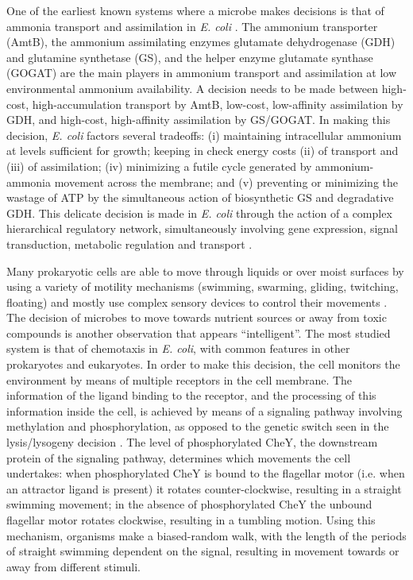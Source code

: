 One of the earliest known systems where a microbe makes decisions is that of ammonia transport and assimilation in \textit{E. coli} \cite{van_heeswijk_nitrogen_2013}. The ammonium transporter (AmtB), the ammonium assimilating enzymes glutamate dehydrogenase (GDH) and glutamine synthetase (GS), and the helper enzyme glutamate synthase (GOGAT) are the main players in ammonium transport and assimilation at low environmental ammonium availability. A decision needs to be made between high-cost, high-accumulation transport by AmtB, low-cost, low-affinity assimilation by GDH, and high-cost, high-affinity assimilation by GS/GOGAT. In making this decision, \textit{E. coli} factors several tradeoffs: (i) maintaining intracellular ammonium at levels sufficient for growth; keeping in check energy costs (ii) of transport and (iii) of assimilation; (iv) minimizing a futile cycle generated by ammonium-ammonia movement across the membrane; and (v) preventing or minimizing the wastage of ATP by the simultaneous action of biosynthetic GS and degradative GDH. This delicate decision is made in \textit{E. coli} through the action of a complex hierarchical regulatory network, simultaneously involving gene expression, signal transduction, metabolic regulation and transport \cite{kahn_control_1991,bruggeman_multifarious_2005,boogerd_amtb-mediated_2011,van_heeswijk_nitrogen_2013}.

Many prokaryotic cells are able to move through liquids or over moist surfaces by using a variety of motility mechanisms (swimming, swarming, gliding, twitching, floating) and mostly use complex sensory devices to control their movements \cite{jarrell_surprisingly_2008}. The decision of microbes to move towards nutrient sources or away from toxic compounds is another observation that appears ``intelligent''. The most studied system is that of chemotaxis in \textit{E. coli}, with common features in other prokaryotes and eukaryotes. In order to make this decision, the cell monitors the environment by means of multiple receptors in the cell membrane. The information of the ligand binding to the receptor, and the processing of this information inside the cell, is achieved by means of a signaling pathway involving methylation and phosphorylation, as opposed to the genetic switch seen in the lysis/lysogeny decision \cite{bourret_molecular_2002}. The level of phosphorylated CheY, the downstream protein of the signaling pathway, determines which movements the cell undertakes: when phosphorylated CheY is bound to the flagellar motor (i.e. when an attractor ligand is present) it rotates counter-clockwise, resulting in a straight swimming movement; in the absence of phosphorylated CheY the unbound flagellar motor rotates clockwise, resulting in a tumbling motion. Using this mechanism, organisms make a biased-random walk, with the length of the periods of straight swimming dependent on the signal, resulting in movement towards or away from different stimuli.

